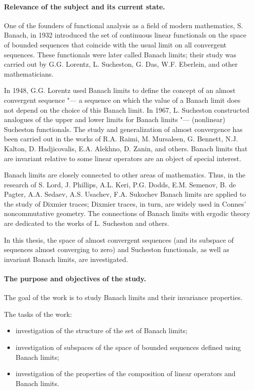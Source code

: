 \paragraph{Relevance of the subject and its current state.}

One of the founders of functional analysis as a field of modern mathematics, S. Banach,
in 1932 introduced the set of continuous linear functionals on the space of bounded sequences
that coincide with the usual limit on all convergent sequences.
These functionals were later called Banach limits;
their study was carried out by G.G. Lorentz, L. Sucheston, G. Das, W.F. Eberlein, and other mathematicians.

In 1948, G.G. Lorentz used Banach limits to define the concept of an almost convergent sequence "---  
a sequence on which the value of a Banach limit does not depend on the choice of this Banach limit.
In 1967, L. Sucheston constructed analogues of the upper and lower limits for Banach limits "---  
(nonlinear) Sucheston functionals.
The study and generalization of almost convergence has been carried out in the works of
R.A. Raimi, M. Mursaleen, G. Bennett, N.J. Kalton, D. Hadjicovalis, E.A. Alekhno, D. Zanin, and others.
Banach limits that are invariant relative to some linear operators are an object of special interest.

Banach limits are closely connected to other areas of mathematics.
Thus, in the research of S. Lord, J. Phillips, A.L. Keri, P.G. Dodds, E.M. Semenov, B. de Pagter,
A.A. Sedaev, A.S. Usachev, F.A. Sukochev Banach limits are applied to the study of Dixmier traces;
Dixmier traces, in turn, are widely used in Connes' noncommutative geometry.
The connections of Banach limits with ergodic theory are dedicated to the works of L. Sucheston and others.

In this thesis, the space of almost convergent sequences
(and its subspace of sequences almost converging to zero)
and Sucheston functionals, as well as invariant Banach limits, are investigated.

\paragraph{The purpose and objectives of the study.}
The goal of the work is to study Banach limits and their invariance properties.

The tasks of the work:
\begin{itemize}
	\item
		investigation of the structure of the set of Banach limits;
	\item
		investigation of subspaces of the space of bounded sequences
		defined using Banach limits;
	\item
		investigation of the properties of the composition of linear operators and Banach limits.
\end{itemize}


